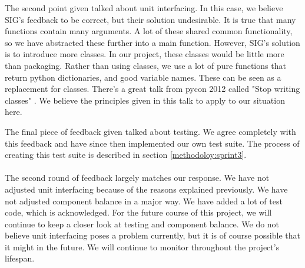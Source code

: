 The second point given talked about unit interfacing.
In this case, we believe SIG's feedback to be correct, but their solution undesirable.
It is true that many functions contain many arguments.
A lot of these shared common functionality, so we have abstracted these further into a main function.
However, SIG's solution is to introduce more classes.
In our project, these classes would be little more than packaging.
Rather than using classes, we use a lot of pure functions that return python dictionaries, and good variable names.
These can be seen as a replacement for classes.
There's a great talk from pycon 2012 called "Stop writing classes" \cite{noclassesvid}.
We believe the principles given in this talk to apply to our situation here.

The final piece of feedback given talked about testing.
We agree completely with this feedback and have since then implemented our own test suite.
The process of creating this test suite is described in section \ref{methodoloy:sprint3}.\\
\\
The second round of feedback largely matches our response.
We have not adjusted unit interfacing because of the reasons explained previously.
We have not adjusted component balance in a major way.
We have added a lot of test code, which is acknowledged.
For the future course of this project, we will continue to keep a closer look at testing and component balance.
We do not believe unit interfacing poses a problem currently, but it is of course possible that it might in the future.
We will continue to monitor throughout the project's lifespan.